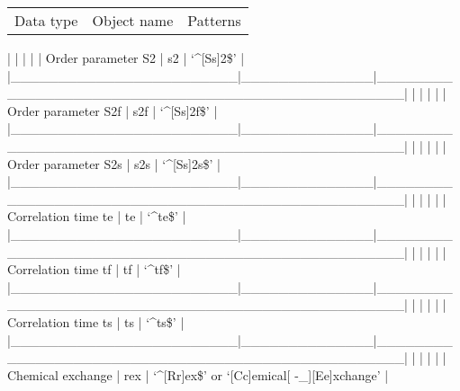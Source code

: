 \begin{tabular}{ccc}
Data type & Object name & Patterns \\
\end{tabular}
|                        |              |                                                  |
| Order parameter S2     | s2           | `\^{}[Ss]2\$'                                        |
|\_\_\_\_\_\_\_\_\_\_\_\_\_\_\_\_\_\_\_\_\_\_\_\_|\_\_\_\_\_\_\_\_\_\_\_\_\_\_|\_\_\_\_\_\_\_\_\_\_\_\_\_\_\_\_\_\_\_\_\_\_\_\_\_\_\_\_\_\_\_\_\_\_\_\_\_\_\_\_\_\_\_\_\_\_\_\_\_\_|
|                        |              |                                                  |
| Order parameter S2f    | s2f          | `\^{}[Ss]2f\$'                                       |
|\_\_\_\_\_\_\_\_\_\_\_\_\_\_\_\_\_\_\_\_\_\_\_\_|\_\_\_\_\_\_\_\_\_\_\_\_\_\_|\_\_\_\_\_\_\_\_\_\_\_\_\_\_\_\_\_\_\_\_\_\_\_\_\_\_\_\_\_\_\_\_\_\_\_\_\_\_\_\_\_\_\_\_\_\_\_\_\_\_|
|                        |              |                                                  |
| Order parameter S2s    | s2s          | `\^{}[Ss]2s\$'                                       |
|\_\_\_\_\_\_\_\_\_\_\_\_\_\_\_\_\_\_\_\_\_\_\_\_|\_\_\_\_\_\_\_\_\_\_\_\_\_\_|\_\_\_\_\_\_\_\_\_\_\_\_\_\_\_\_\_\_\_\_\_\_\_\_\_\_\_\_\_\_\_\_\_\_\_\_\_\_\_\_\_\_\_\_\_\_\_\_\_\_|
|                        |              |                                                  |
| Correlation time te    | te           | `\^{}te\$'                                           |
|\_\_\_\_\_\_\_\_\_\_\_\_\_\_\_\_\_\_\_\_\_\_\_\_|\_\_\_\_\_\_\_\_\_\_\_\_\_\_|\_\_\_\_\_\_\_\_\_\_\_\_\_\_\_\_\_\_\_\_\_\_\_\_\_\_\_\_\_\_\_\_\_\_\_\_\_\_\_\_\_\_\_\_\_\_\_\_\_\_|
|                        |              |                                                  |
| Correlation time tf    | tf           | `\^{}tf\$'                                           |
|\_\_\_\_\_\_\_\_\_\_\_\_\_\_\_\_\_\_\_\_\_\_\_\_|\_\_\_\_\_\_\_\_\_\_\_\_\_\_|\_\_\_\_\_\_\_\_\_\_\_\_\_\_\_\_\_\_\_\_\_\_\_\_\_\_\_\_\_\_\_\_\_\_\_\_\_\_\_\_\_\_\_\_\_\_\_\_\_\_|
|                        |              |                                                  |
| Correlation time ts    | ts           | `\^{}ts\$'                                           |
|\_\_\_\_\_\_\_\_\_\_\_\_\_\_\_\_\_\_\_\_\_\_\_\_|\_\_\_\_\_\_\_\_\_\_\_\_\_\_|\_\_\_\_\_\_\_\_\_\_\_\_\_\_\_\_\_\_\_\_\_\_\_\_\_\_\_\_\_\_\_\_\_\_\_\_\_\_\_\_\_\_\_\_\_\_\_\_\_\_|
|                        |              |                                                  |
| Chemical exchange      | rex          | `\^{}[Rr]ex\$' or `[Cc]emical[ -\_][Ee]xchange'       |
